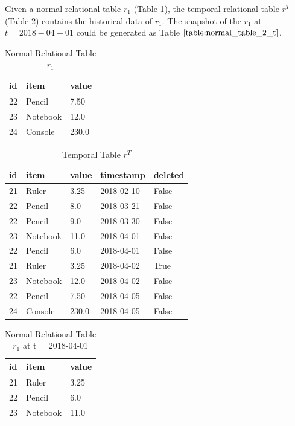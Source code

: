 		\begin{example}
			Given a normal relational table $r_1$ (Table \ref{table:normal_table_2}), the temporal relational table $r^T$ (Table \ref{table:temporal_table_2}) contains the historical data of $r_1$. The snapshot of the $r_1$ at $t=2018-04-01$ could be generated as Table $\ref{table:normal_table_2_t}$.
		\label{example:snapshot_table}
		\end{example}

		\begin{center}
		\begin{table}
			\centering
			\small
			\caption{Normal Relational Table $r_1$}
			\label{table:normal_table_2}
			\begin{tabular}{p{4cm}p{4cm}p{4cm}}
				\hline
				id & item      & value  \\ \hline
				22 & Pencil    & 7.50 \\
				23 & Notebook & 12.0   \\ 
				24 & Console & 230.0 \\ \hline
			\end{tabular}
		\end{table}

		\begin{table}
			\centering
			\small
			\caption{Temporal Table $r^T$}
			\label {table:temporal_table_2}
			\begin{tabular}{p{1cm}p{2cm}p{3cm}p{3cm}p{2cm}}
				\hline
				id & item      & value  & timestamp  & deleted\\ \hline
				21 & Ruler    & 3.25  & 2018-02-10  &  False \\  
				22 & Pencil    & 8.0  & 2018-03-21  &  False \\
				22 & Pencil    & 9.0  & 2018-03-30  &  False\\
				23 & Notebook & 11.0  & 2018-04-01 & False \\
				22 & Pencil & 6.0  & 2018-04-01 & False \\
				21 & Ruler    & 3.25  & 2018-04-02  &  True \\
				23 & Notebook & 12.0  & 2018-04-02 & False \\ 
				22 & Pencil & 7.50  & 2018-04-05 & False \\ 
				24 & Console & 230.0  & 2018-04-05 & False \\ \hline
			\end{tabular}
		\end{table}
		\end{center}
		\begin{center}
		\begin{table}
			\centering
			\small
			\caption{Normal Relational Table $r_1$ at t = 2018-04-01}
			\label{table:normal_table_2_t}
			\begin{tabular}{p{4cm}p{4cm}p{4cm}}
				\hline
				id & item  & value  \\ \hline
				21 & Ruler & 3.25 \\
				22 & Pencil & 6.0   \\ 
				23 & Notebook & 11.0 \\ \hline
			\end{tabular}
		\end{table}
		\end{center}
